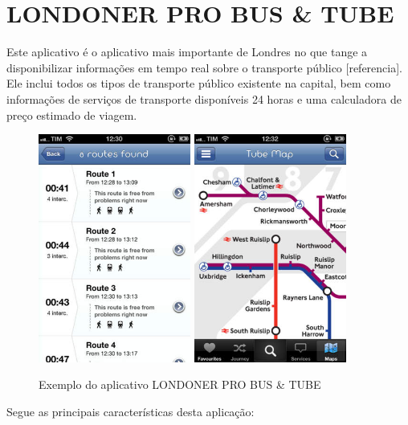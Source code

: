 \section{LONDONER PRO BUS \& TUBE}

Este aplicativo é o aplicativo mais importante de Londres no que tange a disponibilizar informações em tempo real sobre o transporte público [referencia]. Ele inclui todos os tipos de transporte público existente na capital, bem como informações de serviços de transporte disponíveis 24 horas e uma calculadora de preço estimado de viagem.

\begin{figure}[htp]
\begin{center}
  \includegraphics[width=5cm]{images/london1.jpg}
    \includegraphics[width=5cm]{images/lodon2.jpg}
  \caption{Exemplo do aplicativo LONDONER PRO BUS \& TUBE}
  \label{fig:exampleLondon}
\end{center}
\end{figure}

Segue as principais características desta aplicação:

